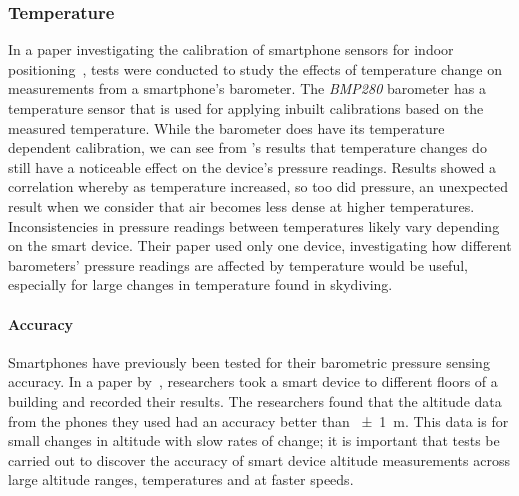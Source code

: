 \subsubsection{Temperature}\label{subsubsec:temperature}
In a paper investigating the calibration of smartphone sensors for indoor positioning~\cite{keller_calibration_2012}, tests were conducted to study the effects of temperature change on measurements from a smartphone's barometer. The \textit{BMP280} barometer has a temperature sensor that is used for applying inbuilt calibrations based on the measured temperature. While the barometer does have its temperature dependent calibration, we can see from \citeauthor{keller_calibration_2012}'s results that temperature changes do still have a noticeable effect on the device's pressure readings. Results showed a correlation whereby as temperature increased, so too did pressure, an unexpected result when we consider that air becomes less dense at higher temperatures. Inconsistencies in pressure readings between temperatures likely vary depending on the smart device. Their paper used only one device, investigating how different barometers' pressure readings are affected by temperature would be useful, especially for large changes in temperature found in skydiving.

\paragraph{Accuracy}\label{accuracy}
Smartphones have previously been tested for their barometric pressure sensing accuracy. In a paper by~\textcite{keller_calibration_2012}, researchers took a smart device to different floors of a building and recorded their results. The researchers found that the altitude data from the phones they used had an accuracy better than \SI{\pm1}{\metre}. This data is for small changes in altitude with slow rates of change; it is important that tests be carried out to discover the accuracy of smart device altitude measurements across large altitude ranges, temperatures and at faster speeds.

